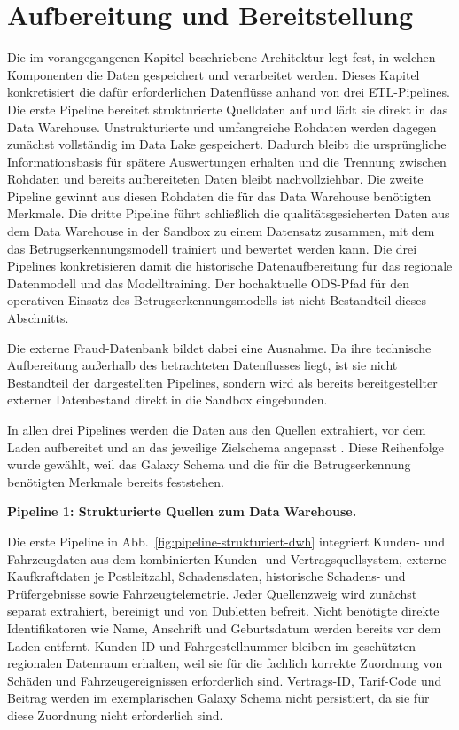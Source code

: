 \section{Aufbereitung und Bereitstellung}
\label{sec:pipeline}

Die im vorangegangenen Kapitel beschriebene Architektur legt fest, in welchen
Komponenten die Daten gespeichert und verarbeitet werden. Dieses Kapitel
konkretisiert die dafür erforderlichen Datenflüsse anhand von drei
ETL-Pipelines. Die erste Pipeline bereitet strukturierte Quelldaten auf und
lädt sie direkt in das Data Warehouse. Unstrukturierte und umfangreiche
Rohdaten werden dagegen zunächst vollständig im Data Lake gespeichert. Dadurch
bleibt die ursprüngliche Informationsbasis für spätere Auswertungen erhalten
und die Trennung zwischen Rohdaten und bereits aufbereiteten Daten bleibt
nachvollziehbar. Die zweite Pipeline gewinnt aus diesen Rohdaten die für das
Data Warehouse benötigten Merkmale. Die dritte Pipeline führt schließlich die
qualitätsgesicherten Daten aus dem Data Warehouse in der Sandbox
zu einem Datensatz zusammen, mit dem das Betrugserkennungsmodell trainiert und
bewertet werden kann.
Die drei Pipelines konkretisieren damit die historische Datenaufbereitung für
das regionale Datenmodell und das Modelltraining. Der hochaktuelle ODS-Pfad
für den operativen Einsatz des Betrugserkennungsmodells ist nicht Bestandteil
dieses Abschnitts.

Die externe Fraud-Datenbank bildet dabei eine Ausnahme. Da ihre technische
Aufbereitung außerhalb des betrachteten Datenflusses liegt, ist sie nicht
Bestandteil der dargestellten Pipelines, sondern wird als bereits
bereitgestellter externer Datenbestand direkt in die Sandbox eingebunden.

In allen drei Pipelines werden die Daten aus den Quellen extrahiert, vor dem
Laden aufbereitet und an das jeweilige Zielschema angepasst
\citep[S.~18--23]{schulz2024}. Diese Reihenfolge wurde gewählt, weil das Galaxy
Schema und die für die Betrugserkennung benötigten Merkmale bereits feststehen.

\medskip
\noindent\textbf{Pipeline 1: Strukturierte Quellen zum Data Warehouse.}

Die erste Pipeline in Abb.~\ref{fig:pipeline-strukturiert-dwh} integriert
Kunden- und Fahrzeugdaten aus dem kombinierten Kunden- und
Vertragsquellsystem, externe Kaufkraftdaten je Postleitzahl, Schadensdaten,
historische Schadens- und Prüfergebnisse sowie Fahrzeugtelemetrie. Jeder
Quellenzweig wird zunächst separat extrahiert, bereinigt und von Dubletten
befreit. Nicht benötigte
direkte Identifikatoren wie Name, Anschrift und Geburtsdatum werden bereits
vor dem Laden entfernt. Kunden-ID und Fahrgestellnummer bleiben im geschützten
regionalen Datenraum erhalten, weil sie für die fachlich korrekte Zuordnung
von Schäden und Fahrzeugereignissen erforderlich sind.
Vertrags-ID, Tarif-Code und Beitrag werden im exemplarischen Galaxy Schema
nicht persistiert, da sie für diese Zuordnung nicht erforderlich sind.

